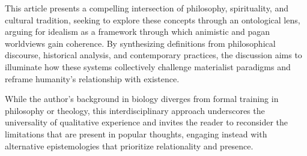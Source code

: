 This article presents a compelling intersection of philosophy, spirituality, and cultural tradition, seeking to explore these concepts
through an ontological lens, arguing for idealism as a framework through which animistic and pagan worldviews gain coherence.
By synthesizing definitions from philosophical discourse, historical analysis, and contemporary practices, the discussion aims to
illuminate how these systems collectively challenge materialist paradigms and reframe humanity’s relationship with existence.

While the author's background in biology diverges from formal training in philosophy or theology, this interdisciplinary approach
underscores the universality of qualitative experience and invites the reader to reconsider the limitations that are present in popular
thoughts, engaging instead with alternative epistemologies that prioritize relationality and presence.

